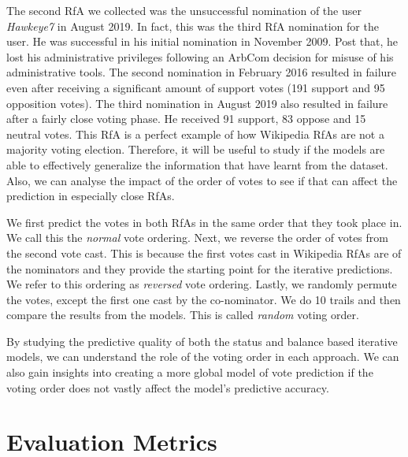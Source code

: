 The second RfA we collected was the unsuccessful nomination of the user \textit{Hawkeye7} in August 2019.
In fact, this was the third RfA nomination for the user.
He was successful in his initial nomination in November 2009.
Post that, he lost his administrative privileges following an ArbCom decision for misuse of his administrative tools.
The second nomination in February 2016 resulted in failure even after receiving a significant amount of support votes (191 support and 95 opposition votes).
The third nomination in August 2019 also resulted in failure after a fairly close voting phase.
He received 91 support, 83 oppose and 15 neutral votes.
This RfA is a perfect example of how Wikipedia RfAs are not a majority voting election.
Therefore, it will be useful to study if the models are able to effectively generalize the information that have learnt from the \wikirfa dataset.
Also, we can analyse the impact of the order of votes to see if that can affect the prediction in especially close RfAs.

We first predict the votes in both RfAs in the same order that they took place in.
We call this the \textit{normal} vote ordering.
Next, we reverse the order of votes from the second vote cast.
This is because the first votes cast in Wikipedia RfAs are of the nominators and they provide the starting point for the iterative predictions.
We refer to this ordering as \textit{reversed} vote ordering.
Lastly, we randomly permute the votes, except the first one cast by the co-nominator.
We do 10 trails and then compare the results from the models.
This is called \textit{random} voting order.

By studying the predictive quality of both the status and balance based iterative models, we can understand the role of the voting order in each approach.
We can also gain insights into creating a more global model of vote prediction if the voting order does not vastly affect the model's predictive accuracy.


\section{Evaluation Metrics}
\label{sec:eval-metrics}
